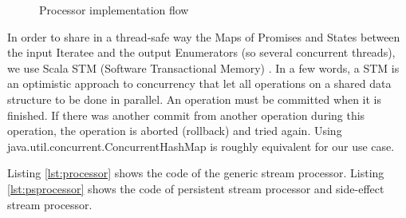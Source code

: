 \begin{figure}
  \begin{center} 
    \caption{Processor implementation flow}
    \label{fig:createOutStream}
  \end{center}
\end{figure}

In order to share in a thread-safe way the Maps of Promises and States between the input Iteratee and the output Enumerators (so several concurrent threads), we use Scala STM (Software Transactional Memory) . In a few words, a STM is an optimistic approach to concurrency that let all operations on a shared data structure to be done in parallel. An operation must be committed when it is finished. If there was another commit from another operation during this operation, the operation is aborted (rollback) and tried again. 
Using java.util.concurrent.ConcurrentHashMap is roughly equivalent for our use case.

Listing \ref{lst:processor} shows the code of the generic stream processor. Listing \ref{lst:psprocessor} shows the code of persistent stream processor and side-effect stream processor. 
\newpage

